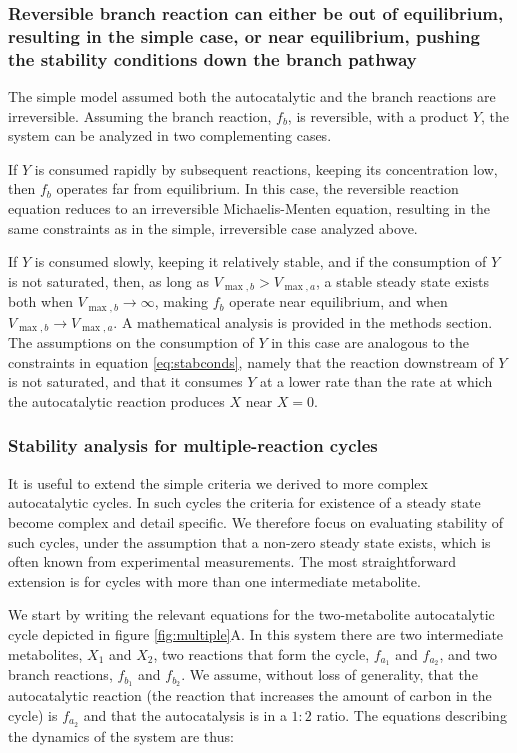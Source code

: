     \subsubsection{Reversible branch reaction can either be out of equilibrium, resulting in the simple case, or near equilibrium, pushing the stability conditions down the branch pathway}
    The simple model assumed both the autocatalytic and the branch reactions are irreversible.
    Assuming the branch reaction, $f_b$, is reversible, with a product $Y$, the system can be analyzed in two complementing cases.

    If $Y$ is consumed rapidly by subsequent reactions, keeping its concentration low, then $f_b$ operates far from equilibrium.
    In this case, the reversible reaction equation reduces to an irreversible Michaelis-Menten equation, resulting in the same constraints as in the simple, irreversible case analyzed above.

    If $Y$ is consumed slowly, keeping it relatively stable, and if the consumption of $Y$ is not saturated, then, as long as $V_{\max,b}>V_{\max,a}$, a stable steady state exists both when  $V_{\max,b}\rightarrow\infty$, making $f_b$ operate near equilibrium, and when $V_{\max,b}\rightarrow V_{\max,a}$.
    A mathematical analysis is provided in the methods section.
    The assumptions on the consumption of $Y$ in this case are analogous to the constraints in equation \ref{eq:stabconds}, namely that the reaction downstream of $Y$ is not saturated, and that it consumes $Y$ at a lower rate than the rate at which the autocatalytic reaction produces $X$ near $X=0$.

   \subsubsection{Stability analysis for multiple-reaction cycles}
    It is useful to extend the simple criteria we derived to more complex autocatalytic cycles.
    In such cycles the criteria for existence of a steady state become complex and detail specific.
    We therefore focus on evaluating stability of such cycles, under the assumption that a non-zero steady state exists, which is often known from experimental measurements.
    The most straightforward extension is for cycles with more than one intermediate metabolite.

    We start by writing the relevant equations for the two-metabolite autocatalytic cycle depicted in figure \ref{fig:multiple}A.
    In this system there are two intermediate metabolites, $X_1$ and $X_2$, two reactions that form the cycle, $f_{a_1}$ and $f_{a_2}$, and two branch reactions, $f_{b_1}$ and $f_{b_2}$.
    We assume, without loss of generality, that the autocatalytic reaction (the reaction that increases the amount of carbon in the cycle) is $f_{a_2}$ and that the autocatalysis is in a $1:2$ ratio.
    The equations describing the dynamics of the system are thus:

